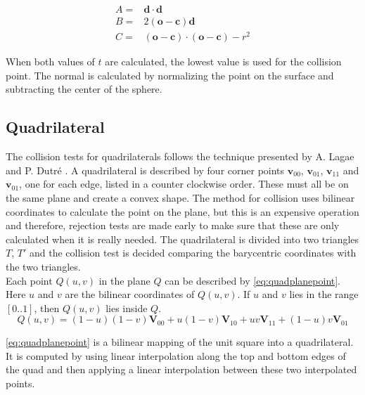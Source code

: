\documentclass[a4paper, 12pt]{report}
\begin{document}
\begin{subequations} \label{eq:sparsub}
\begin{align}
A =& \mathbf{d} \cdot \mathbf{d} \\
B =& 2(\mathbf{o} - \mathbf{c}) \mathbf{d} \\
C =& (\mathbf{o} - \mathbf{c}) \cdot (\mathbf{o} - \mathbf{c}) - r^2
\end{align}
\end{subequations}

When both values of $t$ are calculated, the lowest value is used for the collision point. 
The normal is calculated by normalizing the point on the surface and subtracting the center of the sphere.

\subsection{Quadrilateral}
The collision tests for quadrilaterals follows the technique presented by A. Lagae and P. Dutr\'{e} \cite{quadrilateral}.
A quadrilateral is described by four corner points $ \mathbf{v}_{00} $, $ \mathbf{v}_{01}$, $ \mathbf{v}_{11} $ and $ \mathbf{v}_{01} $, one for each edge, listed in a counter clockwise order.
These must all be on the same plane and create a convex shape.
The method for collision uses bilinear coordinates to calculate the point on the plane, but this is an expensive operation and therefore, rejection tests are made early to make sure that these are only calculated when it is really needed.
The quadrilateral is divided into two triangles $ T $, $ T' $ and the collision test is decided comparing the barycentric coordinates with the two triangles. \\

Each point $ Q(u, v) $ in the plane $ Q $ can be described by \autoref{eq:quadplanepoint}.
Here $ u $ and $ v $ are the bilinear coordinates of $Q(u,v)$. 
If $ u $ and $ v $ lies in the range $ [0 .. 1] $, then $ Q(u,v) $ lies inside $ Q $.\\

\begin{equation} \label{eq:quadplanepoint}
Q(u,v) = (1 - u) (1 - v) \mathbf{V}_{00} + u (1 - v) \mathbf{V}_{10} + uv\mathbf{V}_{11} + (1 - u) v \mathbf{V}_{01}
\end{equation}

\autoref{eq:quadplanepoint} is a bilinear mapping of the unit square into a quadrilateral.
It is computed by using linear interpolation along the top and bottom edges of the quad and then applying a linear interpolation between these two interpolated points.\\
\end{document}

